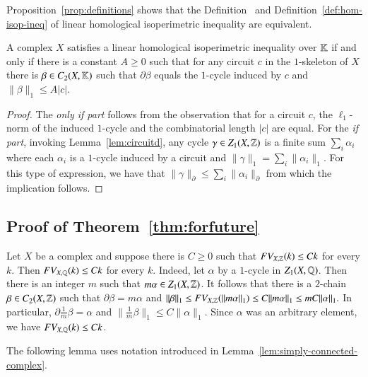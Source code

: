 Proposition~\ref{prop:definitions} shows that the Definition~\cite[2.28]{GrMa09} and  Definition~\ref{def:hom-isop-ineq} of linear homological  isoperimetric inequality are equivalent. 

\begin{proposition}\label{prop:definitions}
A complex $X$ satisfies a {linear homological isoperimetric inequality over $\mathbb{K}$} if and only if there is a constant $A\geq 0$ such that for any circuit $c$ in the $1$-skeleton of $X$  there is $\beta\in C_2(X, \mathbb{K})$ such that $\partial \beta$ equals  the $1$-cycle induced by $c$ and $\|\beta\|_1 \leq A |c|$.
\end{proposition}
\begin{proof}
The \emph{only if part}  follows from the observation that for a circuit $c$, the $\ell_1$-norm of the induced $1$-cycle and the combinatorial length $|c|$ are equal. For the \emph{if part}, invoking Lemma~\ref{lem:circuitd}, any cycle $\gamma \in Z_1(X, \mathbb{Z})$ is a finite sum $\sum_{i} \alpha_i$ where each $\alpha_i$ is a $1$-cycle induced by a circuit and $\|\gamma\|_1 = \sum_{i} \|\alpha_i\|_1$.  For this type of expression, we have that $\|\gamma\|_\partial \leq \sum_{i} \|\alpha_i\|_\partial$ from which the implication follows. 
\end{proof}

\subsection{Proof of Theorem~\ref{thm:forfuture}}

\begin{remark}\label{rem:linearity}
Let $X$ be a complex and suppose there is $C\geq 0$ such that $FV_{X, \mathbb{Z}}(k)\leq Ck$ for every $k$.
Then $FV_{X, \mathbb{Q}}(k) \leq Ck$ for every $k$. Indeed, let $\alpha$ by a $1$-cycle in $Z_1(X, \mathbb{Q})$. Then there is an integer $m$ such that $m\alpha \in Z_1(X, \mathbb{Z})$.  It follows that there is a $2$-chain $\beta \in C_2(X, \mathbb{Z})$ such that $\partial \beta = m\alpha$ and $\|\beta\|_1 \leq FV_{X, \mathbb{Z}}(\|m\alpha\|_1) \leq C\|m\alpha\|_1\leq mC\|\alpha\|_1.$  In particular, $ \partial \frac1m \beta =\alpha$ and $\|\frac1m \beta\|_1 \leq C\|\alpha\|_1$. Since $\alpha$ was an arbitrary element, we have $FV_{X, \mathbb{Q}}(k)\leq Ck$. 
\end{remark}

The following lemma uses notation introduced in Lemma~\ref{lem:simply-connected-complex}.

